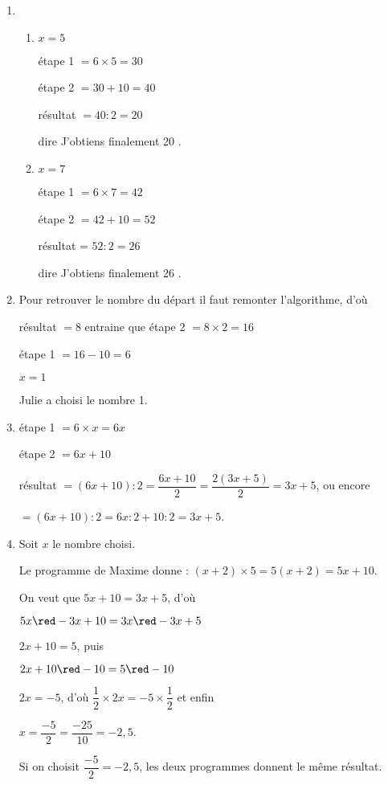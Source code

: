 
\medskip

\begin{enumerate}
\item 
	\begin{enumerate}
		\item $x = 5$
		
étape 1 $= 6 \times 5 = 30$
		
étape 2 $= 30 + 10 = 40$
		
résultat $= 40 : 2 = 20$
		
dire \og J'obtiens finalement 20 \fg.
		\item $x = 7$
		
étape 1 $= 6  \times 7 = 42$
		
étape 2 $= 42 + 10 = 52$
		
résultat = $52 : 2 = 26$
		
dire \og J'obtiens finalement 26 \fg.
	\end{enumerate}
\item Pour retrouver le nombre du départ il faut \og remonter \fg{} l'algorithme, d'où

résultat $= 8$ entraine que  étape 2 $= 8  \times 2 = 16$

étape 1 $= 16 - 10 = 6$

$x = 1$

Julie a choisi le nombre 1.
\item étape 1 $= 6  \times x = 6x$

étape 2 $= 6x + 10$

résultat $= (6x + 10) : 2 = \dfrac{6x + 10}{2} = \dfrac{2(3x + 5)}{2} = 3x + 5$, ou encore 

$= (6x + 10) : 2 = 6x : 2 + 10 : 2 = 3x + 5$.
\item Soit $x$ le nombre choisi.

Le programme de Maxime donne : $(x + 2)  \times 5 = 5(x + 2)  = 5x + 10$.

On veut que $5x + 10 = 3x + 5$, d'où 

$5x {\red - 3x} + 10 = 3x {\red - 3x} + 5$

$2x + 10 = 5$, puis

$2x + 10  {\red - 10}= 5 {\red - 10}$

$2x = - 5$, d'où $\dfrac{1}{2}\times 2x = - 5 \times \dfrac{1}{2}$ et enfin 

$x = \dfrac{- 5}{2} = \dfrac{- 25}{10} = - 2,5$.

Si on choisit $\dfrac{- 5}{2} = - 2,5$, les deux programmes donnent le même résultat.
\end{enumerate}

\vspace{0,5cm}


